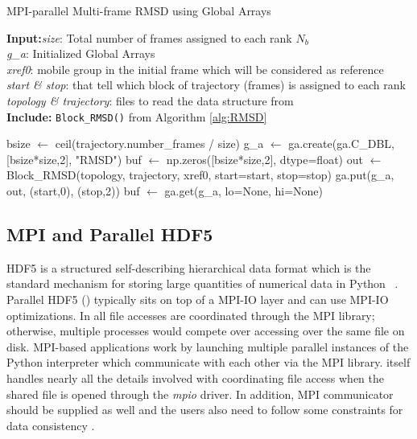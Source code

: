 \begin{algorithm}[ht!]
	\scriptsize
	\caption{MPI-parallel Multi-frame RMSD using Global Arrays}
	\label{alg:GA}
	\hspace*{\algorithmicindent} \textbf{Input:}\emph{size}: Total number of frames assigned to each rank $N_{b}$\\
	\hspace*{\algorithmicindent} \emph{g\_a}: Initialized Global Arrays \\
	\hspace*{\algorithmicindent} \emph{xref0}: mobile group in the initial frame which will be considered as reference \\
	\hspace*{\algorithmicindent} \emph{start \& stop}: that tell which block of trajectory (frames) is assigned to each rank \\
	\hspace*{\algorithmicindent} \emph{topology \& trajectory}: files to read the data structure from \\
	\hspace*{\algorithmicindent}\textbf{Include:} \texttt{Block\_RMSD()} from Algorithm \ref{alg:RMSD}
	\begin{algorithmic}[1]
		
		\State bsize $\leftarrow$ ceil(trajectory.number\_frames / size)
		\State g\_a $\leftarrow$ ga.create(ga.C\_DBL, [bsize*size,2], "RMSD")
		\State buf $\leftarrow$ np.zeros([bsize*size,2], dtype=float)
		\State out $\leftarrow$ Block\_RMSD(topology, trajectory, xref0, start=start, stop=stop)
		\State ga.put(g\_a, out, (start,0), (stop,2))
		\State buf $\leftarrow$ ga.get(g\_a, lo=None, hi=None)
		\EndIf
	\end{algorithmic}
\end{algorithm}

\subsection{MPI and Parallel HDF5}
HDF5 is a structured self-describing hierarchical data format which is the standard mechanism for storing large quantities of numerical data in Python ~\cite{pythonhdf5}.
Parallel HDF5 () typically sits on top of a MPI-IO layer and can use MPI-IO optimizations. 
In  all file accesses are coordinated through the MPI library; otherwise, multiple processes would compete over accessing over the same file on disk. 
MPI-based applications work by launching multiple parallel instances of the Python interpreter which communicate with each other via the MPI library. 
 itself handles nearly all the details involved with coordinating file access when the shared file is opened through the \emph{mpio} driver.
In addition, MPI communicator should be supplied as well and the users also need to follow some constraints for data consistency \cite{pythonhdf5}.

